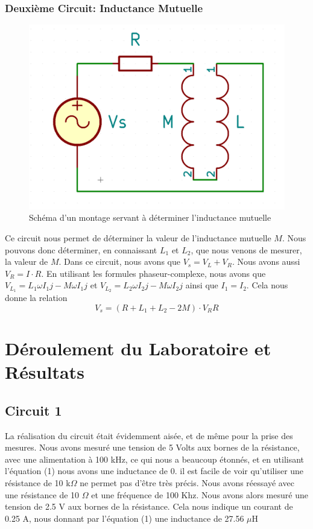 \documentclass{article}
\begin{document}
\subsubsection{Deuxième Circuit: Inductance Mutuelle}
\begin{figure}[h]
    \centering
        \includegraphics[scale = 0.12]{RM.png}
        \caption{Schéma d'un montage servant à déterminer l'inductance mutuelle}
        \label{fig:my_label}
    \end{figure}
Ce circuit nous permet de déterminer la valeur de l'inductance mutuelle $M$.
Nous pouvons donc déterminer, en connaissant $L_{1}$ et $L_{2}$, que nous venons de mesurer, la valeur de $M$.
Dans ce circuit, nous avons que $V_{s} = V_{L} + V_{R}$. Nous avons aussi $V_{R} = I\cdot R$. En utilisant les formules
phaseur-complexe, nous avons que $V_{L_{1}} = L_{1}\omega I_{1}j - M\omega I_{1}j$ et 
$V_{L_{2}} = L_{2}\omega I_{2}j - M\omega I_{2}j$ ainsi que $I_{1} = I_{2}$. Cela nous donne la relation
\begin{equation}
    V_{s} = (R + L_{1} + L_{2} - 2M)\cdot V_{R}R
\end{equation}
\section{Déroulement du Laboratoire et Résultats}
\subsection{Circuit 1}
La réalisation du circuit était évidemment aisée, et de même pour la prise des mesures. Nous avons mesuré une 
tension  de 5 Volts aux bornes de la résistance, avec une alimentation à 100 kHz, ce qui nous a beaucoup étonnés, et en utilisant l'équation (1)
nous avons une inductance de 0.
il est facile de voir qu'utiliser une résistance de 10 k$\Omega$ ne permet pas d'être très précis. Nous avons réessayé avec
une résistance de 10 $\Omega$ et une fréquence de 100 Khz. Nous avons alors mesuré une tension de 2.5 V aux bornes
de la résistance. Cela nous indique un courant de 0.25 A, nous donnant par l'équation (1) une inductance de 27.56 $\mu$H
\end{document}

